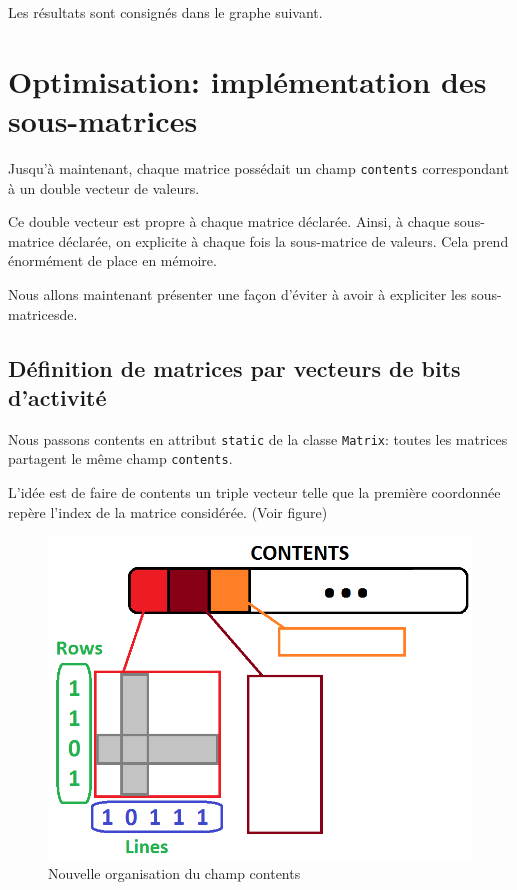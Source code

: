 \documentclass[a4paper,11pt]{article}
\begin{document}
Les résultats sont consignés dans le graphe suivant.

\section{Optimisation: implémentation des sous-matrices}


Jusqu'à maintenant, chaque matrice possédait un champ \texttt{contents} correspondant à un double vecteur de valeurs.

Ce double vecteur est propre à chaque matrice déclarée. Ainsi, à chaque sous-matrice déclarée, on explicite à chaque fois la sous-matrice de valeurs. Cela prend énormément de place en mémoire.

Nous allons maintenant présenter une façon d'éviter à avoir à expliciter les sous-matricesde.

\subsection{Définition de matrices par vecteurs de bits d'activité}

Nous passons contents en attribut \texttt{static} de la classe \texttt{Matrix}: toutes les matrices partagent le même champ \texttt{contents}.

L'idée est de faire de contents un triple vecteur telle que la première coordonnée repère l'index de la matrice considérée. (Voir figure)

\begin{figure}
  \centering
  \includegraphics[scale=0.5]{matimpli.png}
  \caption{Nouvelle organisation du champ contents}
  \label{fig:phd}
\end{figure}
\end{document}

